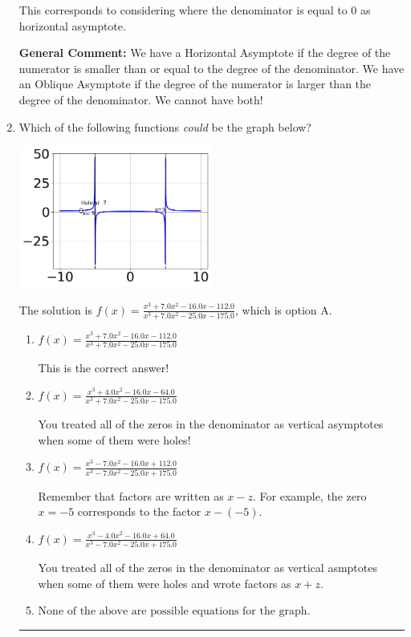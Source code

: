 \documentclass{extbook}[14pt]
\newcommand{\litem}[1]{\item #1

\rule{\textwidth}{0.4pt}}
\begin{document}
\begin{enumerate}
{\begin{enumerate}[label=\Alph*.]
This corresponds to considering where the denominator is equal to 0 as horizontal asymptote.
\end{enumerate}

\textbf{General Comment:} We have a Horizontal Asymptote if the degree of the numerator is smaller than or equal to the degree of the denominator. We have an Oblique Asymptote if the degree of the numerator is larger than the degree of the denominator. We cannot have both!
}
\litem{
Which of the following functions \textit{could} be the graph below?

\begin{center}
    \includegraphics[width=0.5\textwidth]{../Figures/identifyGraphOfRationalFunctionA.png}
\end{center}


The solution is \( f(x)=\frac{x^{3} +7.0 x^{2} -16.0 x -112.0}{x^{3} +7.0 x^{2} -25.0 x -175.0} \), which is option A.\begin{enumerate}[label=\Alph*.]
\item \( f(x)=\frac{x^{3} +7.0 x^{2} -16.0 x -112.0}{x^{3} +7.0 x^{2} -25.0 x -175.0} \)

This is the correct answer!
\item \( f(x)=\frac{x^{3} +4.0 x^{2} -16.0 x -64.0}{x^{3} +7.0 x^{2} -25.0 x -175.0} \)

You treated all of the zeros in the denominator as vertical asymptotes when some of them were holes!
\item \( f(x)=\frac{x^{3} -7.0 x^{2} -16.0 x + 112.0}{x^{3} -7.0 x^{2} -25.0 x + 175.0} \)

Remember that factors are written as $x-z$. For example, the zero $x=-5$ corresponds to the factor $x-(-5)$.
\item \( f(x)=\frac{x^{3} -4.0 x^{2} -16.0 x + 64.0}{x^{3} -7.0 x^{2} -25.0 x + 175.0} \)

You treated all of the zeros in the denominator as vertical asmptotes when some of them were holes and wrote factors as $x+z$.
\item \( \text{None of the above are possible equations for the graph.} \)


\end{enumerate}}
\end{enumerate}
\end{document}
